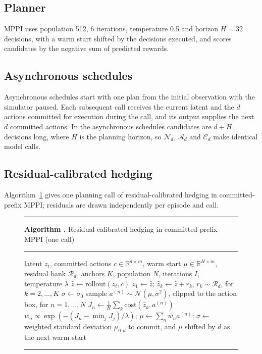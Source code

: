 \documentclass[aps,physrev,\manuscriptlayout,superscriptaddress,
  longbibliography,amsmath,amssymb]{revtex4-2}
\newcounter{algorithm}
\begin{document}
\subsection{Planner}\label{sec:planner}

MPPI\cite{williams2017mppi} uses population 512, 6 iterations, temperature 0.5 and horizon $H=32$ decisions, with a warm start shifted by the decisions executed, and scores candidates by the negative sum of predicted rewards.

\subsection{Asynchronous schedules}\label{sec:async}

Asynchronous schedules start with one plan from the initial observation with the simulator paused. Each subsequent call receives the current latent and the $d$ actions committed for execution during the call, and its output supplies the next $d$ committed actions. In the asynchronous schedules candidates are $d+H$ decisions long, where $H$ is the planning horizon, so $\mathcal{N}_d$, $\mathcal{A}_d$ and $\mathcal{C}_d$ make identical model calls.

\subsection{Residual-calibrated hedging}\label{sec:method}

Algorithm~\ref{alg:hedge} gives one planning call of residual-calibrated hedging in committed-prefix MPPI; residuals are drawn independently per episode and call.

\begin{figure}[t]
\label{alg:hedge}
\hrule\smallskip
\noindent\textbf{Algorithm \thealgorithm.} Residual-calibrated hedging in committed-prefix MPPI (one call)
\smallskip\hrule\smallskip

\begin{algorithmic}[1]
\Require latent $z_t$, committed actions $c\in\mathbb{R}^{d\times m}$, warm start $\mu\in\mathbb{R}^{H\times m}$, residual bank $\mathcal{R}_d$, anchors $K$, population $N$, iterations $I$, temperature $\lambda$
\State $\hat z \gets \mathrm{rollout}(z_t, c)$ 
\State $\hat z_1 \gets \hat z$; $\hat z_k \gets \hat z + r_k$, $r_k\sim\mathcal{R}_d$, for $k=2,\dots,K$
\State $\sigma\gets\sigma_0$
  \State sample $a^{(n)}\sim\mathcal{N}(\mu,\sigma^2)$, clipped to the action box, for $n=1,\dots,N$
  \State $J_n \gets \frac{1}{K}\sum_{k} \mathrm{cost}(\hat z_k, a^{(n)})$ 
  \State $w_n\propto\exp(-(J_n-\min_j J_j)/\lambda)$; $\mu\gets\sum_n w_n a^{(n)}$; $\sigma\gets$ weighted standard deviation
\EndFor
\State \Return $\mu_{0:d}$ to commit, and $\mu$ shifted by $d$ as the next warm start
\end{algorithmic}
\smallskip\hrule
\end{figure}
\end{document}
